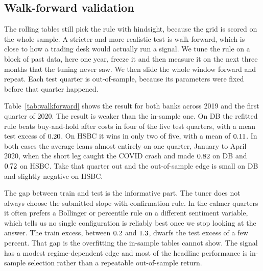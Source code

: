 \documentclass[12pt,a4paper]{article}
\begin{document}
\FloatBarrier
\subsection{Walk-forward validation}\label{sec:walkforward}
The rolling tables still pick the rule with hindsight, because the grid is
scored on the whole sample. A stricter and more realistic test is walk-forward,
which is close to how a trading desk would actually run a signal. We tune the
rule on a block of past data, here one year, freeze it and then measure it on
the next three months that the tuning never saw. We then slide the whole window
forward and repeat. Each test quarter is out-of-sample, because its
parameters were fixed before that quarter happened.

Table~\ref{tab:walkforward} shows the result for both banks across 2019 and the
first quarter of 2020. The result is weaker than the in-sample one. On DB
the refitted rule beats buy-and-hold after costs in four of the five test
quarters, with a mean test excess of $0.20$. On HSBC it wins in only two of
five, with a mean of $0.11$. In both cases the average leans almost
entirely on one quarter, January to April 2020, when the short leg caught the
COVID crash and made $0.82$ on DB and $0.72$ on HSBC. Take that quarter out and the
out-of-sample edge is small on DB and slightly negative on HSBC.

The gap between train and test is the informative part. The tuner does not always choose
the submitted slope-with-confirmation rule. In the calmer quarters it often
prefers a Bollinger or percentile rule on a different sentiment variable, which
tells us no single configuration is reliably best once we stop looking at the
answer. The train excess, between $0.2$ and $1.3$, dwarfs the test
excess of a few percent. That gap is the overfitting the in-sample tables cannot
show. The signal has a modest regime-dependent edge and most of the headline
performance is in-sample selection rather than a repeatable out-of-sample return.
\end{document}
